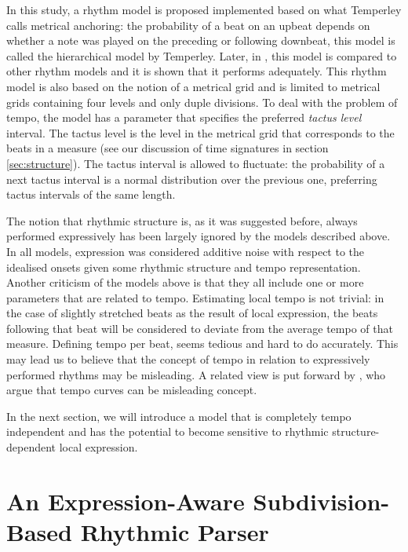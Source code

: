 In this study, a rhythm model is proposed implemented based on what Temperley calls metrical anchoring: the probability of a beat on an upbeat depends on whether a note was played on the preceding or following downbeat, this model is called the hierarchical model by Temperley. Later, in \citet{temperley2010modeling}, this model is compared to other rhythm models and it is shown that it performs adequately. This rhythm model is also based on the notion of a metrical grid and is limited to metrical grids containing four levels and only duple divisions. To deal with the problem of tempo, the model has a parameter that specifies the preferred \textit{tactus level} interval. The tactus level is the level in the metrical grid that corresponds to the beats in a measure (see our discussion of time signatures in section \ref{sec:structure}). The tactus interval is allowed to fluctuate: the probability of a next tactus interval is a normal distribution over the previous one, preferring tactus intervals of the same length.

The notion that rhythmic structure is, as it was suggested before, always performed expressively has been largely ignored by the models described above. In all models, expression was considered additive noise with respect to the idealised onsets given some rhythmic structure and tempo representation. Another criticism of the models above is that they all include one or more parameters that are related to tempo. Estimating local tempo is not trivial: in the case of slightly stretched beats as the result of local expression, the beats following that beat will be considered to deviate from the average tempo of that measure. Defining tempo per beat, seems tedious and hard to do accurately. This may lead us to believe that the concept of tempo in relation to expressively performed rhythms may be misleading. A related view is put forward by \citet{desain1993tempo}, who argue that tempo curves can be misleading concept.

In the next section, we will introduce a model that is completely tempo independent and has the potential to become sensitive to rhythmic structure-dependent local expression.

\section{An Expression-Aware Subdivision-Based Rhythmic Parser}
\label{sec:introducing}


